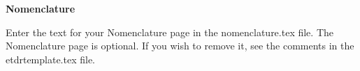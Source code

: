 
\newpage
\vspace*{0.9cm}
\begin{center}
{\bf \Huge Nomenclature}
\end{center}

\setlength{\baselineskip}{0.8cm}



Enter the text for your Nomenclature page in the nomenclature.tex file.  The Nomenclature page is optional.  If you wish to remove it, see the comments in the etdrtemplate.tex file.
